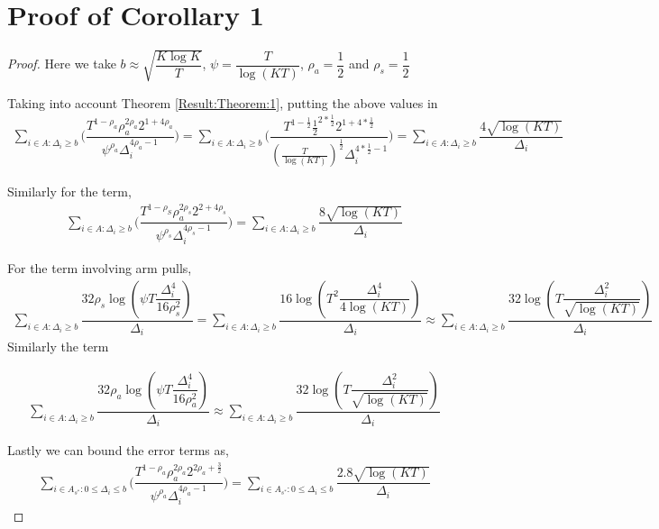 \section{Proof of Corollary 1}
\label{App:Proof:Corollary:1}
\begin{proof}
Here we take $b\approx\sqrt{\dfrac{K\log K}{T}}$, $\psi=\dfrac{T}{\log(KT)}$, $\rho_{a}=\dfrac{1}{2}$ and $\rho_{s}=\dfrac{1}{2}$

	Taking into account Theorem \ref{Result:Theorem:1}, putting the above values in 
	\begin{align*}
	\sum_{i\in A:\Delta_{i}\geq b}\bigg(\dfrac{T^{1-\rho_{a}}\rho_{a}^{2\rho_{a}}2^{1+4\rho_{a}}}{\psi^{\rho_{a}}\Delta_{i}^{4\rho_{a}-1}} \bigg)= \sum_{i\in A:\Delta_{i}\geq b}\bigg(\dfrac{T^{1-\frac{1}{2}}\frac{1}{2}^{2*\frac{1}{2}}2^{1+4*\frac{1}{2}}}{(\frac{T}{\log (KT)})^{\frac{1}{2}}\Delta_{i}^{4*\frac{1}{2}-1}} \bigg)=\sum_{i\in A:\Delta_{i}\geq b}\dfrac{4\sqrt{\log (KT)}}{\Delta_{i}}
	\end{align*}
	
	Similarly for the term,
	\begin{align*}
	\sum_{i\in A:\Delta_{i}\geq b}\bigg(\dfrac{T^{1-\rho_{S}}\rho_{a}^{2\rho_{s}}2^{2+4\rho_{s}}}{\psi^{\rho_{s}}\Delta_{i}^{4\rho_{s}-1}} \bigg) = \sum_{i\in A:\Delta_{i}\geq b}\dfrac{8\sqrt{\log (KT)}}{\Delta_{i}}
	\end{align*}		
			
	
	For the term involving arm pulls,
	\begin{align*}
	\sum_{i\in A:\Delta_{i}\geq b}\dfrac{32\rho_{s}\log{(\psi T\dfrac{\Delta_{i}^{4}}{16\rho_{s}^{2}})}}{\Delta_{i}}=\sum_{i\in A:\Delta_{i}\geq b}\dfrac{16\log{(T^{2}\dfrac{\Delta_{i}^{4}}{4\log (KT)})}}{\Delta_{i}}\approx \sum_{i\in A:\Delta_{i}\geq b}\dfrac{32\log{(T\dfrac{\Delta_{i}^{2}}{\sqrt{\log (KT)}})}}{\Delta_{i}}
	\end{align*}		
	 Similarly the term 
	
	\begin{align*}
	\sum_{i\in A:\Delta_{i}\geq b}\dfrac{32\rho_{a}\log{(\psi T\dfrac{\Delta_{i}^{4}}{16\rho_{a}^{2}})}}{\Delta_{i}}\approx \sum_{i\in A:\Delta_{i}\geq b}\dfrac{32\log{(T\dfrac{\Delta_{i}^{2}}{\sqrt{\log (KT)}})}}{\Delta_{i}}
	\end{align*}		 
	 

	Lastly we can bound the error terms as, 
	\begin{align*}
	\sum\limits_{i\in A_{s^{*}}:0\leq\Delta_{i}\leq b}\bigg(\dfrac{T^{1-\rho_{a}}\rho_{a}^{2\rho_{a}}2^{2\rho_{a}+\frac{3}{2}}}{\psi^{\rho_{a}}\Delta_{i}^{4\rho_{a}-1}} \bigg)= \sum\limits_{i\in A_{s^{*}}:0\leq\Delta_{i}\leq b}\dfrac{2.8\sqrt{\log (KT)}}{\Delta_{i}}
	\end{align*}
	

\end{proof}
